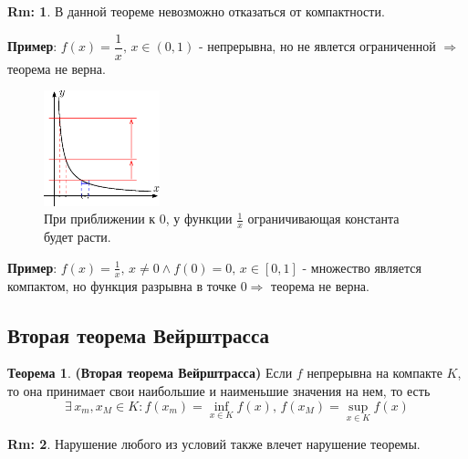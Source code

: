 \documentclass[12pt]{article}
\theoremstyle{definition}
\newtheorem{rem}{Rm:}
\newtheorem{theorem}{Теорема}
\begin{document}
\begin{rem}
	В данной теореме невозможно отказаться от компактности.
\end{rem}

\textbf{Пример}: $f(x) = \dfrac{1}{x}, \, x \in (0,1)$ - непрерывна, но не явлется ограниченной $\Rightarrow$ теорема не верна.

\begin{figure}[H]
	\centering
	\includegraphics[width=0.3\textwidth]{18_2.eps}
	\caption{При приближении к $0$, у функции $\frac{1}{x}$ ограничивающая константа будет расти.}
	\label{18_2}
\end{figure}

\textbf{Пример}: $f(x) = \frac{1}{x}, \, x\neq 0 \wedge f(0) = 0, \, x \in [0,1]$ - множество является компактом, но функция разрывна в точке $0 \Rightarrow$ теорема не верна.

\subsection*{Вторая теорема Вейрштрасса}

\begin{theorem}\textbf{(Вторая теорема Вейрштрасса)}
	Если $f$ непрерывна на компакте $K$, то она принимает свои наибольшие и наименьшие значения на нем, то есть $$\exists \, x_m, x_M \in K \colon f(x_m) = \inf\limits_{x \in K} f(x), \, f(x_M) = \sup\limits_{x \in K} f(x)$$
\end{theorem}

\begin{rem}
	Нарушение любого из условий также влечет нарушение теоремы.
\end{rem}
\end{document}
